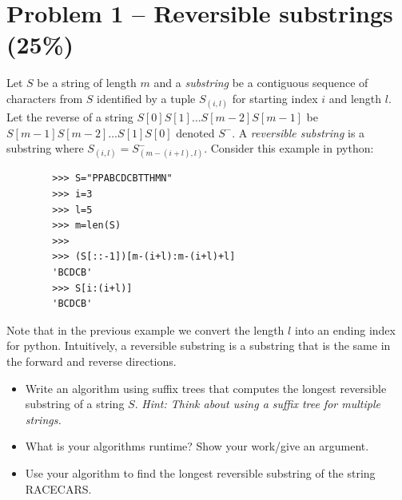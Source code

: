 \documentclass[12pt,letterpaper]{article}
\begin{document}
\begin{enumerate}
    
\end{enumerate}

\section*{Problem 1 -- Reversible substrings (25\%)}    
    Let $S$ be a string of length $m$ and a \textit{substring} be a contiguous sequence of characters from $S$ identified by a tuple $S_{(i,l)}$ for starting index $i$ and length $l$.  
    Let the reverse of a string $S[0] S[1] \dots S[m-2] S[m-1]$ be $S[m-1]S[m-2] \dots S[1] S[0]$ denoted $S^-$.
    A \textit{reversible substring} is a substring  where $S_{(i,l)}=S^-_{(m-(i+l),l)}$. 
    Consider this example in python:
    \begin{verbatim}
        >>> S="PPABCDCBTTHMN"
        >>> i=3
        >>> l=5
        >>> m=len(S)
        >>>
        >>> (S[::-1])[m-(i+l):m-(i+l)+l]
        'BCDCB'
        >>> S[i:(i+l)]
        'BCDCB'
    \end{verbatim}
    Note that in the previous example we convert the length $l$ into an ending index for python.
    Intuitively, a reversible substring is a substring that is the same in the forward and reverse directions.

\begin{itemize}
    \item Write an algorithm using suffix trees that computes the longest reversible substring of a string $S$. 
\textit{Hint: Think about using a suffix tree for multiple strings.}
    \item What is your algorithms runtime? Show your work/give an argument.
    \item Use your algorithm to find the longest reversible substring of the string RACECARS.
\end{itemize}
\end{document}
